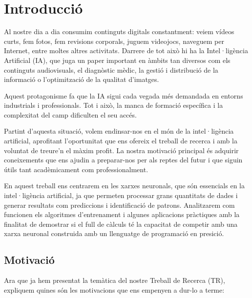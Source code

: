 \chapter{Introducció}
\label{c:intro}
Al nostre dia a dia consumim continguts digitals constantment: veiem vídeos curts, fem fotos, fem revisions corporals, juguem videojocs, naveguem per Internet, entre moltes altres activitats. Darrere de tot això hi ha la Intel·ligència Artificial (IA), que juga un paper important en àmbits tan diversos com els continguts audiovisuals, el diagnòstic mèdic, la gestió i distribució de la informació o l’optimització de la qualitat d’imatges.

Aquest protagonisme fa que la IA sigui cada vegada més demandada en entorns industrials i professionals. Tot i això, la manca de formació específica i la complexitat del camp dificulten el seu accés.

Partint d’aquesta situació, volem endinsar-nos en el món de la intel·ligència artificial, aprofitant l’oportunitat que ens ofereix el treball de recerca i amb la voluntat de treure’n el màxim profit. La nostra motivació principal és adquirir coneixements que ens ajudin a preparar-nos per als reptes del futur i que siguin útils tant acadèmicament com professionalment.

En aquest treball ens centrarem en les xarxes neuronals, que són essencials en la intel·ligència artificial, ja que permeten processar grans quantitats de dades i generar resultats com prediccions i identificació de patrons. Analitzarem com funcionen els algoritmes d’entrenament i algunes aplicacions pràctiques amb la finalitat de demostrar si el full de càlculs té la capacitat de competir amb una xarxa neuronal construida amb un llenguatge de programació en presició.



\section{Motivació}
Ara que ja hem presentat la temàtica del nostre Treball de Recerca (TR), expliquem quines són les motivacions que ens empenyen a dur-lo a terme:

